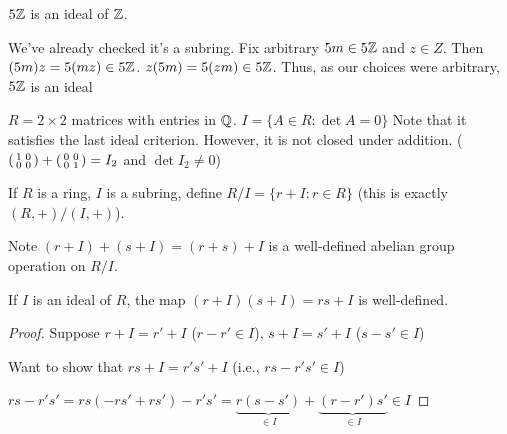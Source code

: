 \documentclass[notes.tex]{subfiles}
\begin{document}
\begin{eg}
	$5\mathbb{Z}$ is an ideal of $\mathbb{Z}$.

	We've already checked it's a subring.
	Fix arbitrary $5m\in 5\mathbb{Z}$ and $z\in Z$.
	Then $(5m)z = 5(mz) \in 5\mathbb{Z}$.
	$z(5m) = 5(zm) \in 5\mathbb{Z}$. Thus, as our choices were arbitrary, $5\mathbb{Z}$ is an ideal
\end{eg}

\begin{eg}
$R = 2\times 2$ matrices with entries in $\mathbb{Q}$.
$I = \{A\in R : \det A = 0\}$
Note that it satisfies the last ideal criterion. However, it is not closed under addition. ($\smattwo 1,0|0,0 + \smattwo 0,0|0,1 = I_2$ and $\det I_2 \ne 0$)
\end{eg}

\begin{defn}
	If $R$ is a ring, $I$ is a subring, define $R/I = \{r+I : r\in R\}$ (this is exactly $(R, +)/(I, +)$).
\end{defn}

Note $(r + I) + (s + I) = (r + s) + I$ is a well-defined abelian group operation on $R/I$.

\begin{proposition}
	If $I$ is an ideal of $R$, the map $(r + I)(s + I) = rs + I$ is well-defined.
\end{proposition}
\begin{proof}
	Suppose $r + I = r' + I$ ($r - r' \in I$), $s + I = s' + I$ ($s - s' \in I$)

	Want to show that $rs + I = r's' + I$ (i.e., $rs-r's' \in I$)

	$rs - r's' = rs(-rs' + rs') - r's' = \underbrace{r(s-s')}_{\in I} + \underbrace{(r-r')s'}_{\in I}\in I$
\end{proof}
\end{document}
